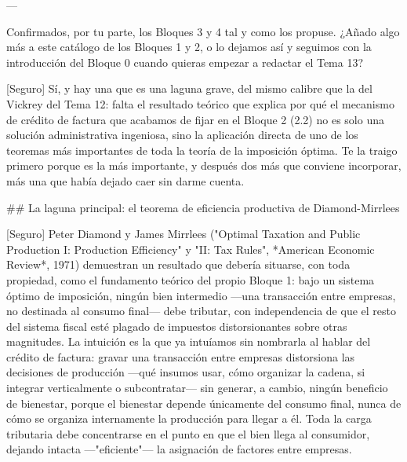 \documentclass[10pt,a4paper]{article}
\begin{document}
---

Confirmados, por tu parte, los Bloques 3 y 4 tal y como los propuse. ¿Añado algo más a este catálogo de los Bloques 1 y 2, o lo dejamos así y seguimos con la introducción del Bloque 0 cuando quieras empezar a redactar el Tema 13?

[Seguro] Sí, y hay una que es una laguna grave, del mismo calibre que la del Vickrey del Tema 12: falta el resultado teórico que explica por qué el mecanismo de crédito de factura que acabamos de fijar en el Bloque 2 (2.2) no es solo una solución administrativa ingeniosa, sino la aplicación directa de uno de los teoremas más importantes de toda la teoría de la imposición óptima. Te la traigo primero porque es la más importante, y después dos más que conviene incorporar, más una que había dejado caer sin darme cuenta.

## La laguna principal: el teorema de eficiencia productiva de Diamond-Mirrlees

[Seguro] Peter Diamond y James Mirrlees ("Optimal Taxation and Public Production I: Production Efficiency" y "II: Tax Rules", *American Economic Review*, 1971) demuestran un resultado que debería situarse, con toda propiedad, como el fundamento teórico del propio Bloque 1: bajo un sistema óptimo de imposición, ningún bien intermedio —una transacción entre empresas, no destinada al consumo final— debe tributar, con independencia de que el resto del sistema fiscal esté plagado de impuestos distorsionantes sobre otras magnitudes. La intuición es la que ya intuíamos sin nombrarla al hablar del crédito de factura: gravar una transacción entre empresas distorsiona las decisiones de producción —qué insumos usar, cómo organizar la cadena, si integrar verticalmente o subcontratar— sin generar, a cambio, ningún beneficio de bienestar, porque el bienestar depende únicamente del consumo final, nunca de cómo se organiza internamente la producción para llegar a él. Toda la carga tributaria debe concentrarse en el punto en que el bien llega al consumidor, dejando intacta —"eficiente"— la asignación de factores entre empresas.
\end{document}
